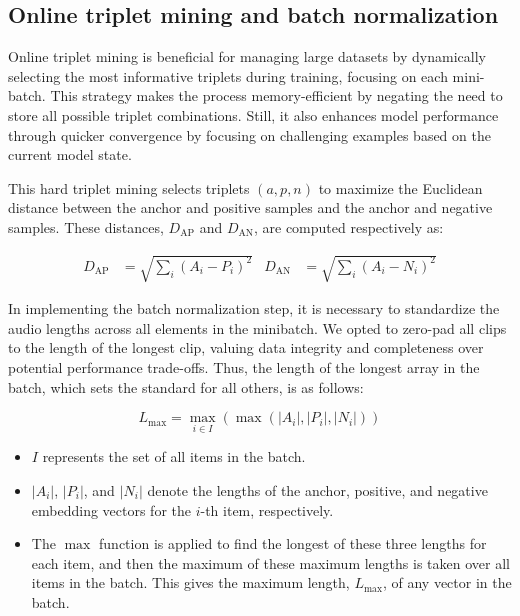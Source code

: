 \subsection{Online triplet mining and batch normalization}

Online triplet mining is beneficial for managing large datasets by dynamically selecting the most informative triplets during training, focusing on each mini-batch. This strategy makes the process memory-efficient by negating the need to store all possible triplet combinations. Still, it also enhances model performance through quicker convergence by focusing on challenging examples based on the current model state.

This hard triplet mining selects triplets $(a, p, n)$ to maximize the Euclidean distance between the anchor and positive samples and the anchor and negative samples. These distances, $D_{\text{AP}}$ and $D_{\text{AN}}$, are computed respectively as:


\begin{align}
D_{\text{AP}} &= \sqrt{\sum_{i} (A_i - P_i)^2} & D_{\text{AN}} &= \sqrt{\sum_{i} (A_i - N_i)^2}
\end{align}


In implementing the batch normalization step, it is necessary to standardize the audio lengths across all elements in the minibatch. We opted to zero-pad all clips to the length of the longest clip, valuing data integrity and completeness over potential performance trade-offs. Thus, the length of the longest array in the batch, which sets the standard for all others, is as follows:

\begin{equation}
L_{\text{max}} = \max_{i \in I} \left( \max \left( |A_i|, |P_i|, |N_i| \right) \right)
\end{equation}

\begin{itemize}
    \item $I$ represents the set of all items in the batch.
    \item $|A_i|$, $|P_i|$, and $|N_i|$ denote the lengths of the anchor, positive, and negative embedding vectors for the $i$-th item, respectively.
    \item The $\max$ function is applied to find the longest of these three lengths for each item, and then the maximum of these maximum lengths is taken over all items in the batch. This gives the maximum length, $L_{\text{max}}$, of any vector in the batch.
    \end{itemize}

\newpage